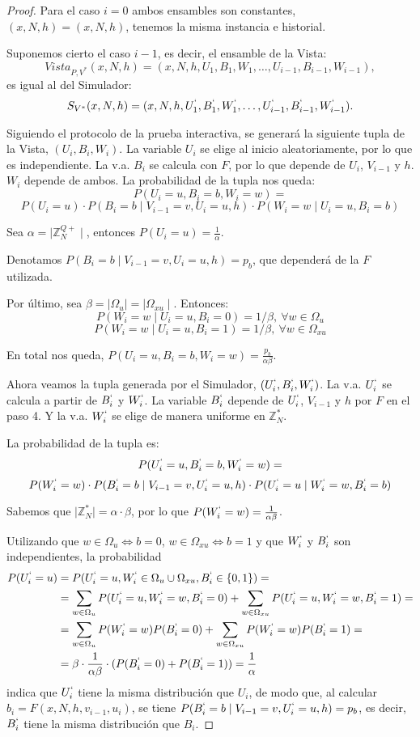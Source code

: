 \begin{proof}
	Para el caso $i=0$ ambos ensambles son constantes, $(x,N,h)=(x,N,h)$, tenemos la misma instancia e historial.
	
	Suponemos cierto el caso $i-1$, es decir, el ensamble de la Vista:
	\[ Vista_{P,V^*}(x,N,h) = (x,N,h,U_1,B_1,W_1,\dots , U_{i-1}, B_{i-1}, W_{i-1}), \]
	es igual al del Simulador:
	\[ S_{V^*}(x,N,h)= (x,N,h,U_1^`,B_1^`,W_1^`,\dots , U_{i-1}^`, B_{i-1}^`, W_{i-1}^`). \]
	

	Siguiendo el protocolo de la prueba interactiva, se generará la siguiente tupla de la Vista, $(U_i, B_i, W_i)$. La variable $U_i$ se elige al inicio aleatoriamente, por lo que es independiente. La v.a. $B_i$ se calcula con $F$, por lo que depende de $U_i$, $V_{i-1}$ y $h$. $W_i$ depende de ambos. La probabilidad de la tupla nos queda:
	\[
	P(U_i=u, B_i=b, W_i=w) = 
	\]
	\[ P(U_i=u)\cdot P(B_i=b \mid V_{i-1}=v, U_i=u,h) \cdot P(W_i=w \mid U_i=u, B_i=b) \]
	
	Sea $\alpha = \mid \mathbb{Z}^{Q+}_N \mid $, entonces $P(U_i=u) = \frac{1}{\alpha}$.
	
	Denotamos $ P(B_i=b \mid V_{i-1}=v, U_i=u,h)=p_b$, que dependerá de la $F$ utilizada.
	
	Por último, sea $\beta = \mid \Omega_u \mid = \mid \Omega_{xu} \mid $. Entonces:
	\[P(W_i=w \mid U_i=u, B_i=0) = 1/\beta,\ \forall w \in \Omega_u\]
	\[P(W_i=w \mid U_i=u, B_i=1) = 1/\beta,\ \forall w \in \Omega_{xu}\]
	
	En total nos queda, $P(U_i=u, B_i=b, W_i=w) = \frac{p_b}{\alpha \beta}$.
	
	
	Ahora veamos la tupla generada por el Simulador, $(U_i^`, B_i^`, W_i^`)$. La v.a. $U_i^`$ se calcula a partir de $B_i^`$ y $W_i^`$. La variable $B_i^`$ depende de $U_i^`$, $V_{i-1}$ y $h$ por $F$ en el paso 4. Y la v.a. $W_i^`$ se elige de manera uniforme en $\mathbb{Z}_N^*$.
	
	La probabilidad de la tupla es:
	\[P(U_i^`=u, B_i^`=b, W_i^`=w) = \]
	\[P(W_i^`=w)\cdot P(B_i^`=b \mid V_{i-1}=v, U_i^`=u,h) \cdot P(U_i^`=u \mid W_i^`=w, B_i^`=b)\]
	
	Sabemos que $\mid \mathbb{Z}^*_N \mid = \alpha \cdot \beta $, por lo que $P(W_i^`=w) = \frac{1}{\alpha \beta}$.
	
	Utilizando que $w\in \Omega_u \Leftrightarrow b=0$, $w\in \Omega_{xu} \Leftrightarrow b=1$ y que $W_i^`$ y $B_i^`$ son independientes, la probabilidad
	\begin{align*}
	P(U_i^`=u)  & = P(U_i^`=u, W_i^`\in \Omega_u \cup \Omega_{xu}, B_i^` \in \{0,1\}) = \\
				&= \sum_{w\in \Omega_u} P(U_i^`=u, W_i^`=w, B_i^` = 0) + \sum_{w\in \Omega_{xu}} P(U_i^`=u, W_i^`=w, B_i^` = 1) =  \\
				&= \sum_{w\in \Omega_u} P(W_i^`=w)P(B_i^` = 0) + \sum_{w\in \Omega_{xu}} P(W_i^`=w)P(B_i^` = 1) = \\
				&=\beta \cdot \frac{1}{\alpha \beta} \cdot (P(B_i^`=0) + P(B_i^`=1)) = \frac{1}{\alpha}
	\end{align*}
	indica que $U_i^`$ tiene la misma distribución que $U_i$, de modo que, al calcular $b_{i} = F(x,N,h,v_{i-1},u_{i})$, se tiene 
	$P(B_i^`=b \mid V_{i-1}=v, U_i^`=u,h) = p_b$, es decir, $B_i^`$ tiene la misma distribución que $B_i$.
	

\end{proof}
